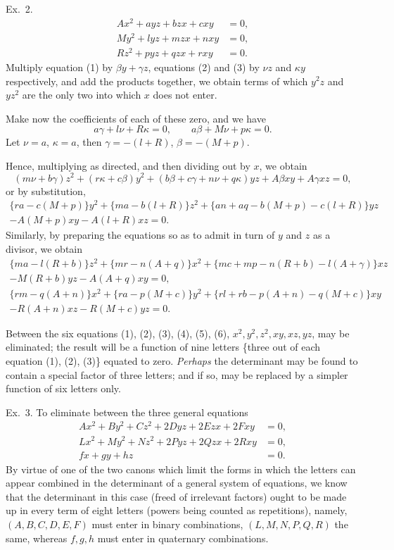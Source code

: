 \documentclass[11pt]{article}
\newcommand{\sourcepage}[1]{\marginpar{\scriptsize p.~#1}}
\begin{document}
\medskip
\noindent Ex.~2.
\begin{align}
 A x^2+ayz+bzx+cxy&=0,\tag{1}\\
 M y^2+lyz+mzx+nxy&=0,\tag{2}\\
 R z^2+pyz+qzx+rxy&=0.\tag{3}
\end{align}
Multiply equation (1) by $\beta y+\gamma z$, equations (2) and (3) by $\nu z$ and $\kappa y$ respectively, and add the products together, we obtain terms of which $y^2z$ and $yz^2$ are the only two into which $x$ does not enter.

Make now the coefficients of each of these zero, and we have
\[
 a\gamma+l\nu+R\kappa=0,
 \qquad
 a\beta+M\nu+p\kappa=0.
\]
Let $\nu=a$, $\kappa=a$, then $\gamma=-(l+R)$, $\beta=-(M+p)$.

Hence, multiplying as directed, and then dividing out by $x$, we obtain
\[
(m\nu+b\gamma)z^2+(r\kappa+c\beta)y^2+(b\beta+c\gamma+n\nu+q\kappa)yz+A\beta xy+A\gamma xz=0,
\]
or by substitution,
\begin{multline}
\{ra-c(M+p)\}y^2+\{ma-b(l+R)\}z^2+
\{an+aq-b(M+p)-c(l+R)\}yz\\
-A(M+p)xy-A(l+R)xz=0.\tag{4}
\end{multline}
Similarly, by preparing the equations so as to admit in turn of $y$ and $z$ as a divisor, we obtain
\begin{multline}
\{ma-l(R+b)\}z^2+\{mr-n(A+q)\}x^2+
\{mc+mp-n(R+b)-l(A+\gamma)\}xz\\
-M(R+b)yz-A(A+q)xy=0,\tag{5}
\end{multline}
\begin{multline}
\{rm-q(A+n)\}x^2+\{ra-p(M+c)\}y^2+
\{rl+rb-p(A+n)-q(M+c)\}xy\\
-R(A+n)xz-R(M+c)yz=0.\tag{6}
\end{multline}

\sourcepage{63}
Between the six equations (1), (2), (3), (4), (5), (6), $x^2,y^2,z^2,xy,xz,yz$, may be eliminated; the result will be a function of nine letters \{three out of each equation (1), (2), (3)\} equated to zero. \emph{Perhaps} the determinant may be found to contain a special factor of three letters; and if so, may be replaced by a simpler function of six letters only.

\medskip
\noindent Ex.~3. \quad To eliminate between the three general equations
\begin{align*}
 Ax^2+By^2+Cz^2+2Dyz+2Ezx+2Fxy&=0,\\
 Lx^2+My^2+Nz^2+2Pyz+2Qzx+2Rxy&=0,\\
 fx+gy+hz&=0.
\end{align*}
By virtue of one of the two canons which limit the forms in which the letters can appear combined in the determinant of a general system of equations, we know that the determinant in this case (freed of irrelevant factors) ought to be made up in every term of eight letters (powers being counted as repetitions), namely, $(A,B,C,D,E,F)$ must enter in binary combinations, $(L,M,N,P,Q,R)$ the same, whereas $f,g,h$ must enter in quaternary combinations.
\end{document}
